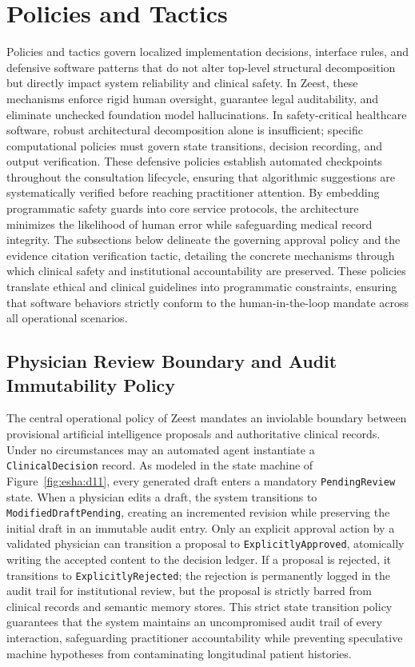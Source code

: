 \section{Policies and Tactics}
Policies and tactics govern localized implementation decisions, interface rules, and defensive software patterns that do not alter top-level structural decomposition but directly impact system reliability and clinical safety. In Zeest, these mechanisms enforce rigid human oversight, guarantee legal auditability, and eliminate unchecked foundation model hallucinations. In safety-critical healthcare software, robust architectural decomposition alone is insufficient; specific computational policies must govern state transitions, decision recording, and output verification. These defensive policies establish automated checkpoints throughout the consultation lifecycle, ensuring that algorithmic suggestions are systematically verified before reaching practitioner attention. By embedding programmatic safety guards into core service protocols, the architecture minimizes the likelihood of human error while safeguarding medical record integrity. The subsections below delineate the governing approval policy and the evidence citation verification tactic, detailing the concrete mechanisms through which clinical safety and institutional accountability are preserved. These policies translate ethical and clinical guidelines into programmatic constraints, ensuring that software behaviors strictly conform to the human-in-the-loop mandate across all operational scenarios.

\subsection{Physician Review Boundary and Audit Immutability Policy}
The central operational policy of Zeest mandates an inviolable boundary between provisional artificial intelligence proposals and authoritative clinical records. Under no circumstances may an automated agent instantiate a \texttt{ClinicalDecision} record. As modeled in the state machine of Figure~\ref{fig:esha:d11}, every generated draft enters a mandatory \texttt{PendingReview} state. When a physician edits a draft, the system transitions to \texttt{ModifiedDraftPending}, creating an incremented revision while preserving the initial draft in an immutable audit entry. Only an explicit approval action by a validated physician can transition a proposal to \texttt{ExplicitlyApproved}, atomically writing the accepted content to the decision ledger. If a proposal is rejected, it transitions to \texttt{ExplicitlyRejected}; the rejection is permanently logged in the audit trail for institutional review, but the proposal is strictly barred from clinical records and semantic memory stores. This strict state transition policy guarantees that the system maintains an uncompromised audit trail of every interaction, safeguarding practitioner accountability while preventing speculative machine hypotheses from contaminating longitudinal patient histories.

